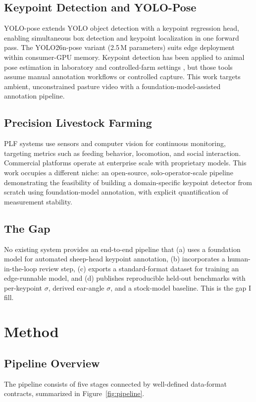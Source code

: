 \documentclass[11pt]{article}
\begin{document}
\subsection{Keypoint Detection and YOLO-Pose}
YOLO-pose \citep{maji2022yolopose} extends YOLO object detection with a keypoint
regression head, enabling simultaneous box detection and keypoint localization
in one forward pass. The YOLO26n-pose variant (2.5\,M parameters) suits edge
deployment within consumer-GPU memory. Keypoint detection has been applied to
animal pose estimation in laboratory and controlled-farm settings
\citep{mathis2018deeplabcut,graving2019deepposekit,pereira2022sleap}, but those
tools assume manual annotation workflows or controlled capture. This work targets
ambient, unconstrained pasture video with a foundation-model-assisted annotation
pipeline.

\subsection{Precision Livestock Farming}
PLF systems \citep{berckmans2014precision} use sensors and computer vision for
continuous monitoring, targeting metrics such as feeding behavior, locomotion,
and social interaction. Commercial platforms operate at enterprise scale with
proprietary models. This work occupies a different niche: an open-source,
solo-operator-scale pipeline demonstrating the feasibility of building a
domain-specific keypoint detector from scratch using foundation-model
annotation, with explicit quantification of measurement stability.

\subsection{The Gap}
No existing system provides an end-to-end pipeline that (a) uses a foundation
model for automated sheep-head keypoint annotation, (b) incorporates a
human-in-the-loop review step, (c) exports a standard-format dataset for
training an edge-runnable model, and (d) publishes reproducible held-out
benchmarks with per-keypoint $\sigma$, derived ear-angle $\sigma$, and a
stock-model baseline. This is the gap I fill.

\section{Method}

\subsection{Pipeline Overview}
The pipeline consists of five stages connected by well-defined data-format
contracts, summarized in Figure~\ref{fig:pipeline}.
\end{document}
